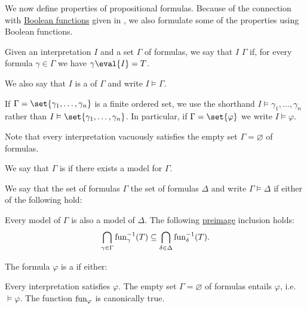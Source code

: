 \begin{definition}\label{def:propositional_semantics}\mcite\cite[def. 7.14]{OpenLogic20201202}
  We now define  properties of propositional formulas. Because of the connection with \hyperref[def:boolean_function]{Boolean functions} given in , we also formulate some of the properties using Boolean functions.

  \begin{defenum}
     Given an interpretation \( I \) and a set \( \Gamma \) of formulas, we say that \( I \)  \( \Gamma \) if, for every formula \( \gamma \in \Gamma \) we have \( \gamma\eval{I} = T \).

    We also say that \( I \) is a  of \( \Gamma \) and write \( I \vDash \Gamma \).

    If \( \Gamma = \set{ \gamma_1, \ldots, \gamma_n } \) is a finite ordered set, we use the shorthand \( I \vDash \gamma_1, \ldots, \gamma_n \) rather than \( I \vDash \set{ \gamma_1, \ldots, \gamma_n } \). In particular, if \( \Gamma = \set{ \varphi } \) we write \( I \vDash \varphi \).

    Note that every interpretation vacuously satisfies the empty set \( \Gamma = \varnothing \) of formulas.

    We say that \( \Gamma \) is  if there exists a model for \( \Gamma \).

     We say that the set of formulas \( \Gamma \)  the set of formulas \( \Delta \) and write \( \Gamma \vDash \Delta \) if either of the following hold:
    \begin{itemize}
       Every model of \( \Gamma \) is also a model of \( \Delta \).
       The following \hyperref[def:function/preimage]{preimage} inclusion holds:
      \begin{equation*}
        \bigcap_{\gamma \in \Gamma} \operatorname{fun}_\gamma^{-1}(T) \subseteq \bigcap_{\delta \in \Delta} \operatorname{fun}_\delta^{-1}(T).
      \end{equation*}
    \end{itemize}

     The formula \( \varphi \) is a  if either:
    \begin{itemize}
       Every interpretation satisfies \( \varphi \).
       The empty set \( \Gamma = \varnothing \) of formulas entails \( \varphi \), i.e. \( \vDash \varphi \).
       The function \( \operatorname{fun}_\varphi \) is canonically true.
    \end{itemize}


\end{defenum}
\end{definition}
